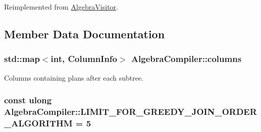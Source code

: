 Reimplemented from \hyperlink{class_algebra_visitor_a681732083691701f0e9c10980392dd3c}{Algebra\+Visitor}.



\subsection{Member Data Documentation}
\hypertarget{class_algebra_compiler_a33ca2507927649bb0176c00ea5944d21}{
\subsubsection[{columns}]{\setlength{\rightskip}{0pt plus 5cm}std\+::map$<$int, {\bf Column\+Info}$>$ Algebra\+Compiler\+::columns}}\label{class_algebra_compiler_a33ca2507927649bb0176c00ea5944d21}
Columns containing plans after each subtree. \hypertarget{class_algebra_compiler_a75bdf7e239082b0a6c8560ac5a75e72a}{
\subsubsection[{L\+I\+M\+I\+T\+\_\+\+F\+O\+R\+\_\+\+G\+R\+E\+E\+D\+Y\+\_\+\+J\+O\+I\+N\+\_\+\+O\+R\+D\+E\+R\+\_\+\+A\+L\+G\+O\+R\+I\+T\+H\+M}]{\setlength{\rightskip}{0pt plus 5cm}const ulong Algebra\+Compiler\+::\+L\+I\+M\+I\+T\+\_\+\+F\+O\+R\+\_\+\+G\+R\+E\+E\+D\+Y\+\_\+\+J\+O\+I\+N\+\_\+\+O\+R\+D\+E\+R\+\_\+\+A\+L\+G\+O\+R\+I\+T\+H\+M = 5\hspace{0.3cm}{\ttfamily [static]}}}\label{class_algebra_compiler_a75bdf7e239082b0a6c8560ac5a75e72a}
